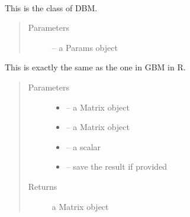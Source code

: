 \documentclass[letterpaper,10pt,english]{sphinxmanual}
\begin{document}
\begin{fulllineitems}
\label{\detokenize{index:dbm_py.interface.AUTO_DBM}}~

\begin{fulllineitems}
\label{\detokenize{index:dbm_py.interface.AUTO_DBM.__init__}}
This is the class of DBM.
\begin{quote}\begin{description}
\item[{Parameters}] \leavevmode
{} -- a Params object

\end{description}\end{quote}

\end{fulllineitems}


\begin{fulllineitems}
\label{\detokenize{index:dbm_py.interface.AUTO_DBM.calibrate_plot}}
This is exactly the same as the one in GBM in R.
\begin{quote}\begin{description}
\item[{Parameters}] \leavevmode\begin{itemize}
\item {} 
 -- a Matrix object

\item {} 
 -- a Matrix object

\item {} 
 -- a scalar

\item {} 
 -- save the result if provided

\end{itemize}

\item[{Returns}] \leavevmode
a Matrix object

\end{description}\end{quote}


\end{fulllineitems}
\end{fulllineitems}
\end{document}
